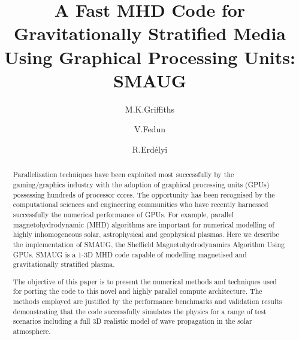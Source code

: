 \documentclass[final,1p]{elsarticle}
\begin{document}
\title{A Fast MHD Code for Gravitationally Stratified Media Using Graphical Processing Units: SMAUG}
\author[swat,cics]{M.K.Griffiths }
\author[acse]{V.Fedun}
\author[swat]{R.Erd\'{e}lyi}
\address[swat]{Solar Physics and Space Plasma Research Centre ($SP^{2}RC$), School of Mathematics and Statistics, University of Sheffield, Hicks Building, Hounsfield Road, S7 3RH, UK}
\address[cics]{Corporate Information and Computing Services, The University of Sheffield, 10-12 Brunswick Street, Sheffield, S10 2FN, UK}
\address[acse]{Department of Automatic Control and Systems Engineering, The University of Sheffield, Mappin Street, Sheffield, S1 3JD, UK}

\begin{abstract}
Parallelisation techniques have been exploited most successfully by the gaming/graphics industry with the adoption of graphical processing units (GPUs) possessing hundreds of processor cores. The opportunity has been recognised by the computational sciences and engineering communities who have recently harnessed successfully the numerical performance of GPUs. For example, parallel magnetohydrodynamic (MHD) algorithms are important for numerical modelling of highly inhomogeneous solar, astrophysical and  geophysical plasmas. Here we describe the implementation of SMAUG, the Sheffield Magnetohydrodynamics Algorithm Using GPUs. SMAUG is a 1-3D MHD code capable of modelling magnetised and gravitationally stratified plasma.

 The objective of this paper is to present the numerical methods and techniques used for porting the code to this novel and highly parallel compute architecture. The methods employed are justified by the performance benchmarks and validation results demonstrating that the code successfully simulates the physics for a range of test scenarios including a full 3D realistic model of wave propagation in the solar atmosphere.
\end{abstract}
\end{document}
